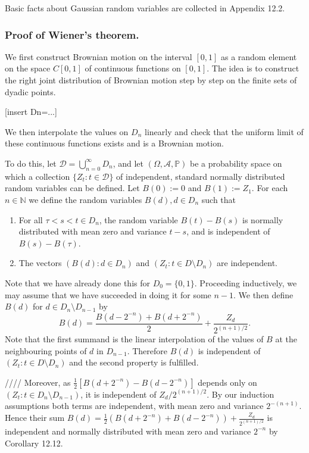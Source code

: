 \documentclass{article}
\begin{document}
Basic facts about Gaussian random variables are collected in Appendix 12.2.

\subsubsection*{Proof of Wiener’s theorem.}
We first construct Brownian motion on the interval $[0, 1]$ as a random element on the space $C[0, 1]$ of continuous functions on $[0, 1]$. The idea is to construct the right joint distribution of Brownian motion step by step on the finite sets of dyadic points. 

[insert Dn=...]

We then interpolate the values on $D_n$ linearly and check that the uniform limit of these continuous functions exists and is a Brownian motion.

To do this, let $\mathcal{D} = \bigcup_{n=0}^\infty D_n$, and let $(\Omega, \mathcal{A}, \mathbb{P})$ be a probability space on which a collection $\{ Z_t : t \in \mathcal{D} \}$ of independent, standard normally distributed random variables can be defined. Let $B(0) := 0$ and $B(1) := Z_1$. For each $n \in \mathbb{N}$ we define the random variables $B(d), d \in D_n$ such that
\begin{enumerate}
    \item For all $\tau < s < t \in D_n$, the random variable $B(t) - B(s)$ is normally distributed with mean zero and variance $t - s$, and is independent of $B(s) - B(\tau)$.
    \item The vectors $\left( B(d) : d \in D_n \right)$ and $\left( Z_t : t \in D \setminus D_n \right)$ are independent.
\end{enumerate}

Note that we have already done this for $D_0 = \{0, 1\}$. Proceeding inductively, we may assume that we have succeeded in doing it for some $n - 1$. We then define $B(d)$ for $d \in D_n \setminus D_{n-1}$ by
\[
    B(d) = \frac{B(d - 2^{-n}) + B(d + 2^{-n})}{2} + \frac{Z_d}{2^{(n+1)/2}}.
\]
Note that the first summand is the linear interpolation of the values of $B$ at the neighbouring points of $d$ in $D_{n-1}$. Therefore $B(d)$ is independent of $\left( Z_t : t \in D \setminus D_n \right)$ and the second property is fulfilled.


////
Moreover, as $\frac{1}{2}\left[ B(d + 2^{-n}) - B(d - 2^{-n}) \right]$ depends only on $(Z_t : t \in D_n \setminus D_{n-1})$, it is independent of $Z_d / 2^{(n+1)/2}$. By our induction assumptions both terms are independent, with mean zero and variance $2^{-(n+1)}$. Hence their sum $B(d) = \frac{1}{2} \left( B(d + 2^{-n}) + B(d - 2^{-n}) \right) + \frac{Z_d}{2^{(n+1)/2}}$ is independent and normally distributed with mean zero and variance $2^{-n}$ by Corollary 12.12.
\end{document}
